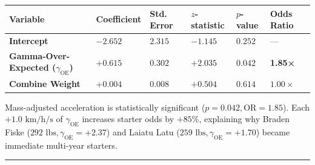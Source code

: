 \documentclass[
  letterpaper,
  DIV=11,
  numbers=noendperiod]{scrartcl}
\newcounter{none} %
\begin{document}
{\def\LTcaptype{none} %
\begin{longtable}[]{@{}
  >{\raggedright\arraybackslash}p{}
  >{\centering\arraybackslash}p{}
  >{\centering\arraybackslash}p{}
  >{\centering\arraybackslash}p{}
  >{\centering\arraybackslash}p{}
  >{\centering\arraybackslash}p{}@{}}
\toprule\noalign{}
\begin{minipage}[b]{\linewidth}\raggedright
Variable
\end{minipage} & \begin{minipage}[b]{\linewidth}\centering
Coefficient
\end{minipage} & \begin{minipage}[b]{\linewidth}\centering
Std. Error
\end{minipage} & \begin{minipage}[b]{\linewidth}\centering
\(z\)-statistic
\end{minipage} & \begin{minipage}[b]{\linewidth}\centering
\(p\)-value
\end{minipage} & \begin{minipage}[b]{\linewidth}\centering
Odds Ratio
\end{minipage} \\
\midrule\noalign{}
\endhead
\bottomrule\noalign{}
\endlastfoot
\textbf{Intercept} & \(-2.652\) & \(2.315\) & \(-1.145\) & \(0.252\) &
--- \\
\textbf{Gamma-Over-Expected (\(\gamma_{\text{OE}}\))} & \(+0.615\) &
\(0.302\) & \(+2.035\) & \textbf{\(0.042\)} & \textbf{1.85×} \\
\textbf{Combine Weight} & \(+0.004\) & \(0.008\) & \(+0.504\) &
\(0.614\) & \(1.00×\) \\
\end{longtable}
}

Mass-adjusted acceleration is statistically significant
(\(p = 0.042, \text{OR} = 1.85\)). Each \(+1.0\text{ km/h/s}\) of
\(\gamma_{\text{OE}}\) increases starter odds by \(+85\%\), explaining
why Braden Fiske (\(292\text{ lbs}, \gamma_{\text{OE}} = +2.37\)) and
Laiatu Latu (\(259\text{ lbs}, \gamma_{\text{OE}} = +1.70\)) became
immediate multi-year starters.

\begin{center}\rule{0.5\linewidth}{0.5pt}\end{center}
\end{document}

